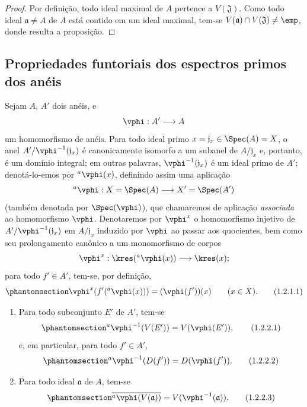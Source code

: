 \documentclass[oneside]{amsart}
\makeatletter
\newcommand{\ega@arrow}[2]{\mathchoice{#1}{#2}{#2}{#2}}
\renewcommand{\to}{\ega@arrow{\longrightarrow}{\rightarrow}}
\let\EGAOriginalLabel\label
\renewcommand{\label}[1]{\phantomsection\EGAOriginalLabel{#1}}
\makeatother
\begin{document}
\begin{proof}
Por definição, todo ideal maximal de $A$ pertence a $V(\mathfrak{J})$.
Como todo ideal $\mathfrak{a}\neq A$ de $A$ está contido em um ideal maximal, tem-se $V(\mathfrak{a})\cap V(\mathfrak{J})\neq\emp$, donde resulta a proposição.
\end{proof}

\subsection{Propriedades funtoriais dos espectros primos dos anéis}
\label{subsection:I.1.2}

\begin{env}[1.2.1]
\label{I.1.2.1}
Sejam $A$, $A'$ dois anéis, e
\[
  \vphi:A'\to A
\]
um homomorfismo de anéis.
Para todo ideal primo $x=\mathfrak{j}_x\in\Spec(A)=X$, o anel $A'/\vphi^{-1}(\mathfrak{j}_x)$ é canonicamente isomorfo a um subanel de $A/\mathfrak{j}_x$ e, portanto, é um domínio integral; em outras palavras, $\vphi^{-1}(\mathfrak{j}_x)$ é um ideal primo de $A'$;
denotá-lo-emos por ${}^a\vphi(x)$, definindo assim uma aplicação
\[
  {}^a\vphi:X=\Spec(A)\to X'=\Spec(A')
\]
(também denotada por $\Spec(\vphi)$), que chamaremos de aplicação \emph{associada} ao homomorfismo $\vphi$.
Denotaremos por $\vphi^x$ o homomorfismo injetivo de $A'/\vphi^{-1}(\mathfrak{j}_x)$ em $A/\mathfrak{j}_x$ induzido por $\vphi$ ao passar aos quocientes, bem como seu prolongamento canônico a um monomorfismo de corpos
\[
  \vphi^x:\kres({}^a\vphi(x))\to\kres(x);
\]
para todo $f'\in A'$, tem-se, por definição,
\[
  \label{I.1.2.1.1}
  \vphi^x(f'({}^a\vphi(x)))=(\vphi(f'))(x)\qquad(x\in X).
  \tag{1.2.1.1}
\]
\end{env}

\begin{proposition}[1.2.2]
\label{I.1.2.2}
\medskip\noindent
\begin{enumerate}
  \item[{\rm(i)}] Para todo subconjunto $E'$ de $A'$, tem-se
    \[
    \label{I.1.2.2.1}
      {}^a\vphi^{-1}(V(E'))=V(\vphi(E')),
      \tag{1.2.2.1}
    \]
    e, em particular, para todo $f'\in A'$,
    \[
    \label{I.1.2.2.2}
      {}^a\vphi^{-1}(D(f'))=D(\vphi(f')).
      \tag{1.2.2.2}
    \]
  \item[{\rm(ii)}] Para todo ideal $\mathfrak{a}$ de $A$, tem-se
    \[
    \label{I.1.2.2.3}
      \overline{{}^a\vphi(V(\mathfrak{a}))}=V(\vphi^{-1}(\mathfrak{a})).
      \tag{1.2.2.3}
    \]
\end{enumerate}
\end{proposition}
\end{document}
